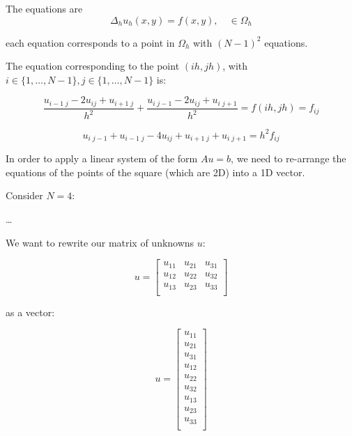 The equations are 
\begin{equation*}
\Delta_h u_h (x, y) = f(x, y), \quad \in \Omega_h
\end{equation*}

each equation corresponds to a point in $\Omega_h$ with $(N-1)^2$ equations.

The equation corresponding to the point $(ih, jh)$, with $i \in  \{1, \dots, N-1 \}, j \in  \{1, \dots, N-1 \}$ is:

\begin{equation*}
\frac{u_{i-1\; j} - 2 u_{ij} + u_{i+1\; j}}{h^2} + \frac{u_{i\; j-1} - 2 u_{ij} + u_{i\; j+1}}{h^2} = f(ih, jh) = f_{ij}
\end{equation*}

\begin{equation*}
u_{i\; j-1} + u_{i-1\; j} -4 u_{ij} +  u_{i+1\; j} + u_{i\; j+1} = h^2 f_{ij}
\end{equation*}

In order to apply a linear system of the form $A u = b$, we need to re-arrange the equations of the points of the square (which are 2D) into a 1D vector.

Consider $N=4$:

\dots

We want to rewrite our matrix of unknowns $u$:

\begin{equation*}
u = \begin{bmatrix}
u_{11} & u_{21} & u_{31} \\
u_{12} & u_{22} & u_{32} \\
u_{13} & u_{23} & u_{33} \\
\end{bmatrix}
\end{equation*}

as a vector:

\begin{equation*}
u = \begin{bmatrix}
u_{11} \\
u_{21} \\
u_{31} \\
u_{12} \\
u_{22} \\
u_{32} \\
u_{13} \\
u_{23} \\
u_{33} \\
\end{bmatrix}
\end{equation*}

